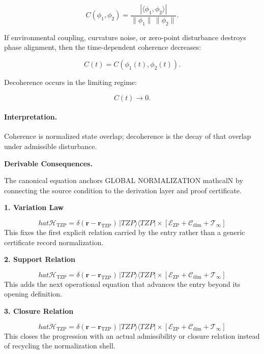 \begin{equation}
C(\phi_1,\phi_2)
=
\frac{
|\langle \phi_1,\phi_2\rangle|
}{
\|\phi_1\|\,\|\phi_2\|
}.
\end{equation}

If environmental coupling, curvature noise, or zero-point disturbance destroys phase alignment, then the time-dependent coherence decreases:

\begin{equation}
C(t)
=
C(\phi_1(t),\phi_2(t)).
\end{equation}

Decoherence occurs in the limiting regime:

\begin{equation}
\boxed{
C(t)\rightarrow 0 .
}
\end{equation}

\paragraph{Interpretation.}
Coherence is normalized state overlap; decoherence is the decay of that overlap under admissible disturbance.

\par\vspace{0.35em}
\noindent\textbf{Derivable Consequences.}\quad
\begingroup
\footnotesize
\raggedright
The canonical equation anchors GLOBAL NORMALIZATION mathcalN by connecting the source condition to the derivation layer and proof certificate.
\par\endgroup

\noindent\textbf{1. Variation Law}\par
\[
hat{\mathcal{H}}_{\text{TZP}} = \delta(\mathbf{r} - \mathbf{r}_{\text{TZP}}) \, |TZP\rangle\langle TZP| \times \left[ \mathcal{E}_{\text{ZP}} + \mathcal{C}_{\text{dim}} + \mathcal{T}_{\infty} \right]
\]
\noindent This fixes the first explicit relation carried by the entry rather than a generic certificate record normalization.\par
\noindent\textbf{2. Support Relation}\par
\[
hat{\mathcal{H}}_{\text{TZP}} = \delta(\mathbf{r} - \mathbf{r}_{\text{TZP}}) \, |TZP\rangle\langle TZP| \times \left[ \mathcal{E}_{\text{ZP}} + \mathcal{C}_{\text{dim}} + \mathcal{T}_{\infty} \right]
\]
\noindent This adds the next operational equation that advances the entry beyond its opening definition.\par
\noindent\textbf{3. Closure Relation}\par
\[
hat{\mathcal{H}}_{\text{TZP}} = \delta(\mathbf{r} - \mathbf{r}_{\text{TZP}}) \, |TZP\rangle\langle TZP| \times \left[ \mathcal{E}_{\text{ZP}} + \mathcal{C}_{\text{dim}} + \mathcal{T}_{\infty} \right]
\]
\noindent This closes the progression with an actual admissibility or closure relation instead of recycling the normalization shell.\par

